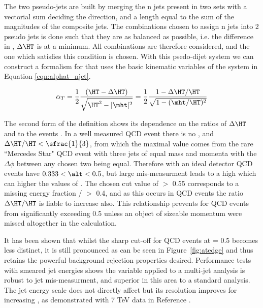 The two pseudo-jets are built by merging the n jets present in two sets with a vectorial sum deciding the direction, and a length equal to the sum of the magnitudes of the composite jets. The combinations chosen to assign n jets into 2 pseudo jets is done such that they are as balanced as possible, i.e. the difference in \HT, $\Delta \HT$ is at a minimum. All combinations are therefore considered, and the one which satisfies this condition is chosen. With this psedo-dijet system we can construct a formalism for \alt that uses the basic kinematic variables of the system in Equation \ref{eqn:alphat_njet}. 

\begin{equation}
\alpha_{T} =\frac{1}{2} \frac{(\HT - \Delta \HT)}{\sqrt{\HT^{2} - |\mht|^{2}}}  = \frac{1}{2} \frac{1-\Delta \HT / \HT}{\sqrt{1 - (\mht / \HT)^{2}}}
\label{eqn:alphat_njet}
\end{equation}

The second form of the definition shows its dependence on the ratios of $\Delta \HT$ and \mht to the events \HT. In a well measured QCD event there is no \mht, and $\Delta \HT / \HT < \sfrac{1}{3}$, from which the maximal value comes from the rare ``Mercedes Star" QCD event with three jets of equal mass and momenta with the $\Delta \phi$ between any chosen two being equal. Therefore with an ideal detector QCD events have $0.333 < \alt < 0.5$, but large mis-measurment leads to a high \mht which can higher the values of \alt. The chosen cut value of \alt $>$ 0.55 corresponds to a missing energy fraction \mht / \HT $>$ 0.4, and as this occurs in QCD events the ratio $\Delta \HT / \HT$ is liable to increase also. This relationship prevents \alt for QCD events from significantly exceeding 0.5 unless an object of sizeable momentum were missed altogether in the calculation. 

It has been shown that whilst the sharp cut-off for QCD events at \alt = 0.5 becomes less distinct, it is still pronounced as can be seen in Figure~\ref{fig:atedge} and thus retains the powerful background rejection properties desired\cite{an2009_56}. Performance tests with smeared jet energies shows the \alt variable applied to a multi-jet analysis is robust to jet mis-measurment, and superior in this area to a standard \met analysis. The jet energy scale does not directly affect \alt but its resolution improves for increasing \HT, as demonstrated with 7 TeV data in Reference \cite{an2010_119}. 

